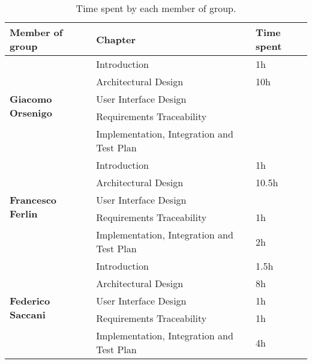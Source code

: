 \begin{table}[H]
    \centering
    \begin{tabular}{|l|l|l|}
        \hline
        \textbf{Member of group }                  & \textbf{Chapter}                          & \textbf{Time spent} \\\hline
        \multirow{5}{*}{\textbf{Giacomo Orsenigo}} & Introduction                              & 1h                  \\
                                                   & Architectural Design                      & 10h                 \\
                                                   & User Interface Design                     &                     \\
                                                   & Requirements Traceability                 &                     \\
                                                   & Implementation, Integration and Test Plan &                     \\\hline
        \multirow{5}{*}{\textbf{Francesco Ferlin}} & Introduction                              & 1h                  \\
                                                   & Architectural Design                      & 10.5h               \\
                                                   & User Interface Design                     &                     \\
                                                   & Requirements Traceability                 & 1h                  \\
                                                   & Implementation, Integration and Test Plan & 2h                  \\\hline
        \multirow{5}{*}{\textbf{Federico Saccani}} & Introduction                              & 1.5h                \\
                                                   & Architectural Design                      & 8h                  \\
                                                   & User Interface Design                     & 1h                    \\
                                                   & Requirements Traceability                 & 1h                    \\
                                                   & Implementation, Integration and Test Plan & 4h                  \\\hline
    \end{tabular}
    \caption{Time spent by each member of group.}
    \label{table:Time spent}
\end{table}
